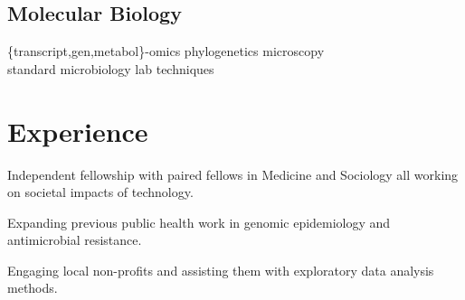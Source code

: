 \documentclass[]{Finlay_Maguire_CV}
\begin{document}
\begin{minipage}[t]{0.33\textwidth}
\subsection{Molecular Biology}
\{transcript,gen,metabol\}-omics \textbullet{} phylogenetics \textbullet{} 
microscopy \textbullet{} \\ standard microbiology lab techniques 
\sectionsep



%
%

\end{minipage} 
\hfill
\begin{minipage}[t]{0.66\textwidth} 


\section{Experience}

    \vspace{0.1cm}
\begin{tightemize}
\item Independent fellowship with paired fellows in Medicine and Sociology all working on societal impacts of technology.
\item Expanding previous public health work in genomic epidemiology and antimicrobial resistance.
\item Engaging local non-profits and assisting them with exploratory data analysis methods.
\end{tightemize}


\end{minipage}
\end{document}
